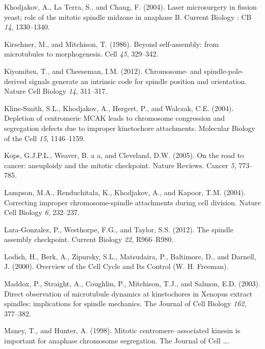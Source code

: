 \documentclass[12pt,a4paper,twoside,openright]{book}
\begin{document}
Khodjakov, A., La Terra, S., and Chang, F. (2004). Laser microsurgery in
fission yeast; role of the mitotic spindle midzone in anaphase B.
Current Biology : CB \emph{14}, 1330--1340.

Kirschner, M., and Mitchison, T. (1986). Beyond self-assembly: from
microtubules to morphogenesis. Cell \emph{45}, 329--342.

Kiyomitsu, T., and Cheeseman, I.M. (2012). Chromosome- and
spindle-pole-derived signals generate an intrinsic code for spindle
position and orientation. Nature Cell Biology \emph{14}, 311--317.

Kline-Smith, S.L., Khodjakov, A., Hergert, P., and Walczak, C.E. (2004).
Depletion of centromeric MCAK leads to chromosome congression and
segregation defects due to improper kinetochore attachments. Molecular
Biology of the Cell \emph{15}, 1146--1159.

Kops, G.J.P.L., Weaver, B. a a, and Cleveland, D.W. (2005). On the road
to cancer: aneuploidy and the mitotic checkpoint. Nature Reviews. Cancer
\emph{5}, 773--785.

Lampson, M.A., Renduchitala, K., Khodjakov, A., and Kapoor, T.M. (2004).
Correcting improper chromosome-spindle attachments during cell division.
Nature Cell Biology \emph{6}, 232--237.

Lara-Gonzalez, P., Westhorpe, F.G., and Taylor, S.S. (2012). The spindle
assembly checkpoint. Current Biology \emph{22}, R966--R980.

Lodish, H., Berk, A., Zipursky, S.L., Matsudaira, P., Baltimore, D., and
Darnell, J. (2000). Overview of the Cell Cycle and Its Control (W. H.
Freeman).

Maddox, P., Straight, A., Coughlin, P., Mitchison, T.J., and Salmon,
E.D. (2003). Direct observation of microtubule dynamics at kinetochores
in Xenopus extract spindles: implications for spindle mechanics. The
Journal of Cell Biology \emph{162}, 377--382.

Maney, T., and Hunter, A. (1998). Mitotic centromere--associated kinesin
is important for anaphase chromosome segregation. The Journal of Cell
\ldots{}.
\end{document}
